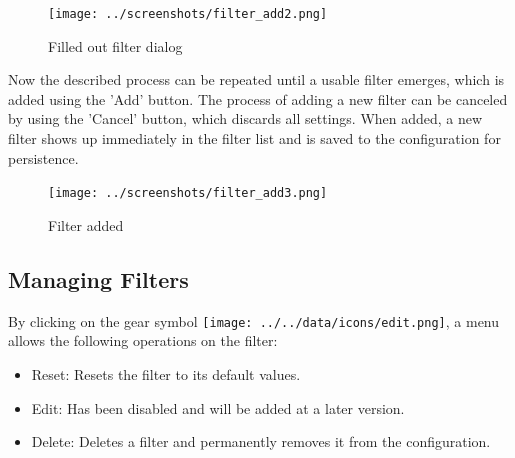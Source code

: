 \begin{figure}[H]
  \center
    \texttt{[image: ../screenshots/filter\_add2.png]}
  \caption{Filled out filter dialog}
  \label{fig:filter_add2}
\end{figure}

Now the described process can be repeated until a usable filter emerges, which is added using the 'Add'
button. The process of adding a new filter can be canceled by using the 'Cancel' button, which discards all
settings. When added, a new filter shows up immediately in the filter list and is saved to the configuration
for persistence.

\begin{figure}[H]
  \center
    \texttt{[image: ../screenshots/filter\_add3.png]}
  \caption{Filter added}
  \label{fig:filter_add3}
\end{figure}

\subsection{Managing Filters}
\label{sec:filter_management}

By clicking on the gear symbol \texttt{[image: ../../data/icons/edit.png]}, a menu allows the following operations on the filter:

\begin{itemize}  
\item Reset: Resets the filter to its default values.
\item Edit: Has been disabled and will be added at a later version.
\item Delete: Deletes a filter and permanently removes it from the configuration.
\end{itemize}
 
